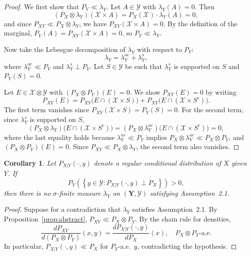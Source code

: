 \documentclass[12pt]{amsart}
\newtheorem{corollary}{Corollary}[theorem]
\theoremstyle{definition}
\theoremstyle{remark}
\newcommand{\ms}[1]{(\mathbf{#1},\mathcal{#1})}
\begin{document}
\begin{proof}
    We first show that $P_Y \ll \lambda_Y$. Let $A \in \mathcal{Y}$ with $\lambda_Y(A) = 0$. Then
    \[
        (P_X \otimes \lambda_Y)(\mathcal{X} \times A) = P_X(\mathcal{X}) \cdot \lambda_Y(A) = 0,
    \]
    and since $P_{XY} \ll P_X \otimes \lambda_Y$, we have $P_{XY}(\mathcal{X} \times A) = 0$. By the definition of the marginal, $P_Y(A) = P_{XY}(\mathcal{X} \times A) = 0$, so $P_Y \ll \lambda_Y$.

    Now take the Lebesgue decomposition of $\lambda_Y$ with respect to $P_Y$:
    \[
        \lambda_Y = \lambda_Y^{ac} + \lambda_Y^{s},
    \]
    where $\lambda_Y^{ac} \ll P_Y$ and $\lambda_Y^{s} \perp P_Y$. Let $S \in \mathcal{Y}$ be such that $\lambda_Y^{s}$ is supported on $S$ and $P_Y(S) = 0$.

    Let $E \in \mathcal{X} \otimes \mathcal{Y}$ with $(P_X \otimes P_Y)(E) = 0$. We show $P_{XY}(E) = 0$ by writing
    \[
        P_{XY}(E) = P_{XY}\bigl(E \cap (\mathcal{X} \times S)\bigr) + P_{XY}\bigl(E \cap (\mathcal{X} \times S^c)\bigr).
    \]
    The first term vanishes since $P_{XY}(\mathcal{X} \times S) = P_Y(S) = 0$. For the second term, since $\lambda_Y^{s}$ is supported on $S$,
    \[
        (P_X \otimes \lambda_Y)\bigl(E \cap (\mathcal{X} \times S^c)\bigr) = (P_X \otimes \lambda_Y^{ac})\bigl(E \cap (\mathcal{X} \times S^c)\bigr) = 0,
    \]
    where the last equality holds because $\lambda_Y^{ac} \ll P_Y$ implies $P_X \otimes \lambda_Y^{ac} \ll P_X \otimes P_Y$, and $(P_X \otimes P_Y)(E) = 0$. Since $P_{XY} \ll P_X \otimes \lambda_Y$, the second term also vanishes.
\end{proof}

\begin{corollary}\label{cor:abstract}
    Let $P_{X|Y}(\cdot, y)$ denote a regular conditional distribution of $X$ given $Y$. If
    \[
        P_Y\!\left(\left\{ y \in \mathcal{Y} : P_{X|Y}(\cdot, y) \perp P_X \right\}\right) > 0,
    \]
    then there is no $\sigma$-finite measure $\lambda_Y$ on $\ms{Y}$ satisfying Assumption~2.1.
\end{corollary}

\begin{proof}
    Suppose for a contradiction that $\lambda_Y$ satisfies Assumption~2.1. By Proposition~\ref{prop:abstract}, $P_{XY} \ll P_X \otimes P_Y$. By the chain rule for densities,
    \[
        \frac{dP_{XY}}{d(P_X \otimes P_Y)}(x, y) = \frac{dP_{X|Y}(\cdot, y)}{dP_X}(x), \quad P_X \otimes P_Y\text{-a.e.}
    \]
    In particular, $P_{X|Y}(\cdot, y) \ll P_X$ for $P_Y$-a.e.\ $y$, contradicting the hypothesis.
\end{proof}
\end{document}
